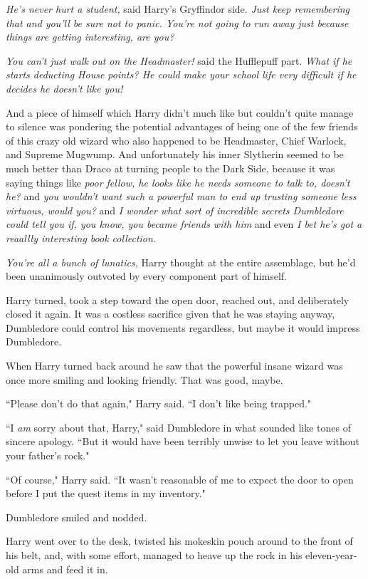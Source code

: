 \emph{He's never hurt a student,} said Harry's Gryffindor side. \emph{Just keep remembering that and you'll be sure not to panic. You're not going to run away just because things are getting interesting, are you?}

\emph{You can't just walk out on the Headmaster!} said the Hufflepuff part. \emph{What if he starts deducting House points? He could make your school life very difficult if he decides he doesn't like you!}

And a piece of himself which Harry didn't much like but couldn't quite manage to silence was pondering the potential advantages of being one of the few friends of this crazy old wizard who also happened to be Headmaster, Chief Warlock, and Supreme Mugwump. And unfortunately his inner Slytherin seemed to be much better than Draco at turning people to the Dark Side, because it was saying things like \emph{poor fellow, he looks like he needs someone to talk to, doesn't he?} and \emph{you wouldn't want such a powerful man to end up trusting someone less virtuous, would you?} and \emph{I wonder what sort of incredible secrets Dumbledore could tell you if, you know, you became friends with him} and even \emph{I bet he's got a reaallly interesting book collection}.

\emph{You're all a bunch of lunatics,} Harry thought at the entire assemblage, but he'd been unanimously outvoted by every component part of himself.

Harry turned, took a step toward the open door, reached out, and deliberately closed it again. It was a costless sacrifice given that he was staying anyway, Dumbledore could control his movements regardless, but maybe it would impress Dumbledore.

When Harry turned back around he saw that the powerful insane wizard was once more smiling and looking friendly. That was good, maybe.

``Please don't do that again," Harry said. ``I don't like being trapped."

``I \emph{am} sorry about that, Harry," said Dumbledore in what sounded like tones of sincere apology. ``But it would have been terribly unwise to let you leave without your father's rock."

``Of course," Harry said. ``It wasn't reasonable of me to expect the door to open before I put the quest items in my inventory."

Dumbledore smiled and nodded.

Harry went over to the desk, twisted his mokeskin pouch around to the front of his belt, and, with some effort, managed to heave up the rock in his eleven-year-old arms and feed it in.

